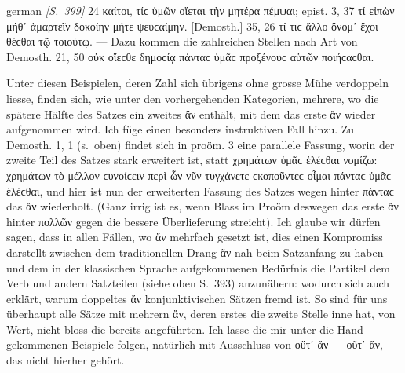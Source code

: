\begin{otherlanguage*}{german}
\hypertarget{p399}{\emph{[S.~399]}}\label{p399} 24 καίτοι, τίϲ  ὑμῶν οἴεται τὴν μητέρα πέμψαι; epist. 3, 37 τί  εἰπὼν μήθ᾽ ἁμαρτεῖν δοκοίην μήτε ψευϲαίμην. [Demosth.] 35, 26 τί  τιϲ ἄλλο ὄνομ᾽ ἔχοι θέϲθαι τῷ τοιούτῳ. — Dazu kommen die zahlreichen Stellen nach Art von Demosth. 21, 50 οὐκ  οἴεϲθε δημοϲίᾳ πάνταϲ ὑμᾶϲ προξένουϲ αὑτῶν ποιήϲαϲθαι. 

Unter diesen Beispielen, deren Zahl sich übrigens ohne grosse Mühe verdoppeln liesse, finden sich, wie unter den vorhergehenden Kategorien, mehrere, wo die spätere Hälfte des Satzes ein zweites ἄν enthält, mit dem das erste ἄν wieder aufgenommen wird. Ich füge einen besonders instruktiven Fall hinzu. Zu Demosth. 1, 1 (s.~oben) findet sich in proöm. 3 eine parallele Fassung, worin der zweite Teil des Satzes stark erweitert ist, statt χρημάτων ὑμᾶϲ ἑλέϲθαι νομίζω: χρημάτων τὸ μέλλον ϲυνοίϲειν περὶ ὧν νῦν τυγχάνετε ϲκοποῦντεϲ οἶμαι πάνταϲ ὑμᾶϲ ἑλέϲθαι, und hier ist nun der erweiterten Fassung des Satzes wegen hinter πάνταϲ das ἄν wiederholt. (Ganz irrig ist es, wenn Blass im Proöm deswegen das erste ἄν hinter πολλῶν gegen die bessere Überlieferung streicht). Ich glaube wir dürfen sagen, dass in allen Fällen, wo ἄν mehrfach gesetzt ist, dies einen Kompromiss darstellt zwischen dem traditionellen Drang ἄν nah beim Satzanfang zu haben und dem in der klassischen Sprache aufgekommenen Bedürfnis die Partikel dem Verb und andern Satzteilen (siehe oben S.~393) anzunähern: wodurch sich auch erklärt, warum doppeltes ἄν konjunktivischen Sätzen fremd ist. So sind für uns überhaupt alle Sätze mit mehrern ἄν, deren erstes die zweite Stelle inne hat, von Wert, nicht bloss die bereits angeführten. Ich lasse die mir unter die Hand gekommenen Beispiele folgen, natürlich mit Ausschluss von οὔτ᾽ ἄν — οὔτ᾽ ἄν, das nicht hierher gehört.


\end{otherlanguage*}
